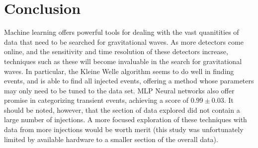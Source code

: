 \documentclass{article}
\begin{document}
\section{Conclusion}
Machine learning offers powerful tools for dealing with the vast quanitities of data that need to be searched for gravitational waves. As more detectors come online, and the sensitivity and time resolution of these detectors increase, techniques such as these will become invaluable in the search for gravitational waves. In particular, the Kleine Welle algorithm seems to do well in finding events, and is able to find all injected events, offering a method whose parameters may only need to be tuned to the data set. MLP Neural networks also offer promise in categorizing transient events, achieving a score of $0.99\pm0.03$. It should be noted, however, that the section of data explored did not contain a large number of injections. A more focused exploration of these techniques with data from more injections would be worth merit (this study was unfortunately limited by available hardware to a smaller section of the overall data).



\end{document}
